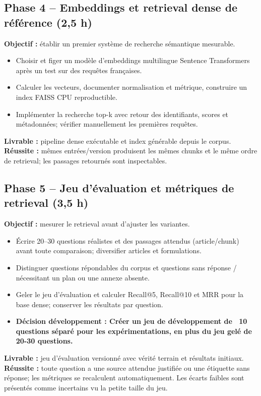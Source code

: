 \documentclass[11pt,a4paper]{article}
\begin{document}
\subsection*{Phase 4 -- Embeddings et retrieval dense de référence (2,5 h)}
\textbf{Objectif :} établir un premier système de recherche sémantique mesurable.
\begin{itemize}
  \item Choisir et figer un modèle d'embeddings multilingue Sentence Transformers après un test sur des requêtes françaises.
  \item Calculer les vecteurs, documenter normalisation et métrique, construire un index FAISS CPU reproductible.
  \item Implémenter la recherche top-k avec retour des identifiants, scores et métadonnées; vérifier manuellement les premières requêtes.
\end{itemize}
\textbf{Livrable :} pipeline dense exécutable et index générable depuis le corpus.\\
\textbf{Réussite :} mêmes entrées/version produisent les mêmes chunks et le même ordre de retrieval; les passages retournés sont inspectables.

\subsection*{Phase 5 -- Jeu d'évaluation et métriques de retrieval (3,5 h)}
\textbf{Objectif :} mesurer le retrieval avant d'ajuster les variantes.
\begin{itemize}
  \item Écrire 20--30 questions réalistes et des passages attendus (article/chunk) avant toute comparaison; diversifier articles et formulations.
  \item Distinguer questions répondables du corpus et questions sans réponse / nécessitant un plan ou une annexe absente.
  \item Geler le jeu d'évaluation et calculer Recall@5, Recall@10 et MRR pour la base dense; conserver les résultats par question.
  \item \textbf{Décision développement : Créer un jeu de développement de ~10 questions séparé pour les expérimentations, en plus du jeu gelé de 20-30 questions.}
\end{itemize}
\textbf{Livrable :} jeu d'évaluation versionné avec vérité terrain et résultats initiaux.\\
\textbf{Réussite :} toute question a une source attendue justifiée ou une étiquette sans réponse; les métriques se recalculent automatiquement. Les écarts faibles sont présentés comme incertains vu la petite taille du jeu.
\end{document}
